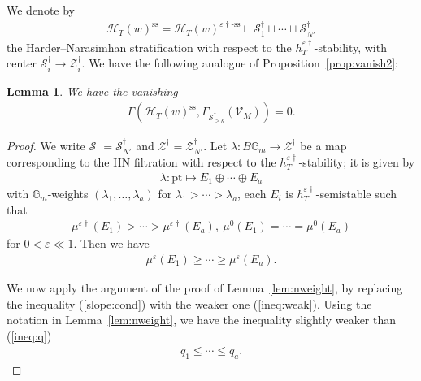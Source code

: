 \documentclass[11pt,oneside,a4paper,mathscr]{amsart}
\newtheorem{lemma}[thm]{Lemma}
\theoremstyle{definition}
\renewcommand{\leq}{\leqslant}
\renewcommand{\geq}{\geqslant}
\newcommand{\cS}{\mathcal{S}}
\newcommand{\cH}{\mathcal{H}}
\newcommand{\bgm}{B\mathbb{G}_m}
\newcommand{\vd}{\varepsilon\dag}
\begin{document}
We denote by 
\begin{align*}
    \cH_T(w)^{\mathrm{ss}}=
    \cH_T(w)^{\varepsilon\dag\text{-ss}} \sqcup 
    \cS_1^{\dag} \sqcup \cdots \sqcup \cS_{N'}^{\dag} 
\end{align*}
the Harder--Narasimhan stratification with respect to the $h_T^{\varepsilon \dag}$-stability, 
with center $\mathcal{S}_i^{\dag} \to \mathcal{Z}_i^{\dag}$. We have the following analogue of Proposition~\ref{prop:vanish2}: 
\begin{lemma}\label{lem:vanish2dag}
We have the vanishing 
\begin{align}\label{vanish:gammaO}
\Gamma(\cH_T(w)^{\mathrm{ss}}, \Gamma_{\cS_{\geq k}^{\dag}}(\mathcal{V}_M))=0.
\end{align}
\end{lemma}
\begin{proof}
We write $\cS^{\dag}=\cS_{N'}^{\dag}$ and $\mathcal{Z}^{\dag}=\mathcal{Z}_{N'}^{\dag}$. 
   Let $\lambda \colon \bgm \to \mathcal{Z}^{\dag}$ be a map corresponding to the HN filtration with respect to the $h_T^{\vd}$-stability; it is 
   given by 
   \begin{align*}
       \lambda \colon \mathrm{pt} \mapsto E_1 \oplus \cdots \oplus E_a
   \end{align*}
   with $\mathbb{G}_m$-weights $(\lambda_1, \ldots, \lambda_a)$
   for $\lambda_1>\cdots>\lambda_a$, 
    each $E_i$ is $h_T^{\varepsilon\dag}$-semistable such that 
   \begin{align*}
       \mu^{\varepsilon \dag}(E_1)>\cdots>\mu^{\varepsilon \dag}(E_a), \ \mu^0(E_1)=\cdots=\mu^0(E_a)
   \end{align*}
   for $0<\varepsilon \ll 1$. 
   Then we have 
   \begin{align}\label{ineq:weak}
       \mu^{\varepsilon}(E_1) \geq \cdots \geq \mu^{\varepsilon}(E_a).
   \end{align}

   We now apply the argument of the proof of Lemma~\ref{lem:nweight}, by replacing 
   the inequality (\ref{slope:cond}) with the weaker one (\ref{ineq:weak}). 
   Using the notation in Lemma~\ref{lem:nweight}, we have 
   the inequality slightly weaker than (\ref{ineq:q})
   \begin{align}\label{ineq:q2}
   q_1 \leq \cdots \leq q_a. 
   \end{align}
   

\end{proof}
\end{document}
